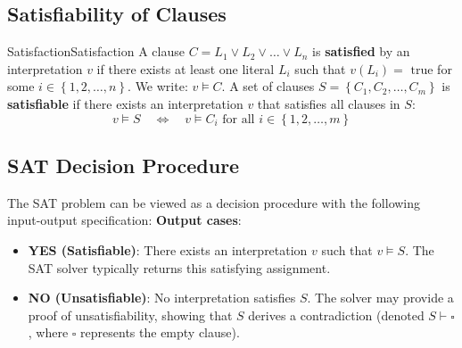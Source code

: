 \documentclass[a4paper]{article}
\theoremstyle{definition}
\begin{document}
\subsection{Satisfiability of Clauses}
\begin{definition}{Satisfaction}{Satisfaction}
A clause \( C = L_1 \vee L_2 \vee \ldots \vee L_n \) is \textbf{satisfied} by an interpretation \( v \) if there 
exists at least one literal \( L_i \) such that \( v(L_i) = \text{ true} \) for some \( i \in \left\{ 1,2, \ldots, n \right\} \).
\vspace{1em}
\noindent
\newline
We write: \( v \models C \). 
\vspace{1em}
\noindent
\newline
A set of clauses \( S = \left\{ C_1, C_2, \ldots, C_m \right\} \) is \textbf{satisfiable} if there exists an interpretation 
\( v \) that satisfies all clauses in \( S \):
\[
  v \models S \quad \Leftrightarrow \quad v \models C_i \text{ for all } i \in \left\{1,2, \ldots, m \right\} 
\]
\end{definition}
\subsection{SAT Decision Procedure}
The SAT problem can be viewed as a decision procedure with the following input-output specification:
\textbf{Output cases}:
\begin{itemize}
    \item \textbf{YES (Satisfiable)}: There exists an interpretation \( v \) such that \( v \models S \). The SAT solver typically returns this satisfying assignment.
    \item \textbf{NO (Unsatisfiable)}: No interpretation satisfies \( S \). The solver may provide a proof of unsatisfiability, showing that \( S \) derives a contradiction (denoted \( S \vdash \square \), where \( \square \) represents the empty clause).
\end{itemize}
\end{document}
